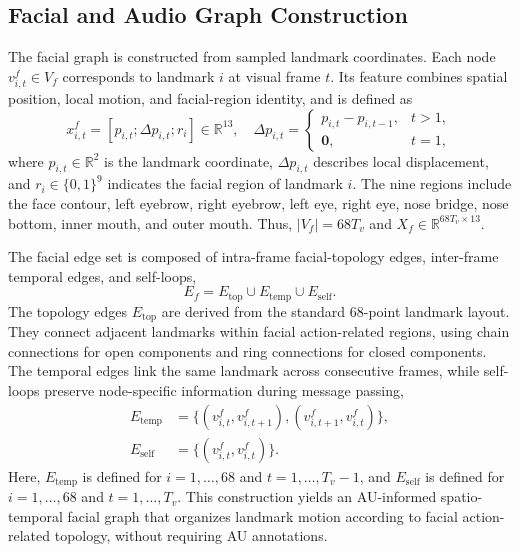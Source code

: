 \documentclass[conference]{IEEEtran}
\begin{document}
\subsection{Facial and Audio Graph Construction}

The facial graph is constructed from sampled landmark coordinates. Each node $v^f_{i,t}\in V_f$ corresponds to landmark $i$ at visual frame $t$. Its feature combines spatial position, local motion, and facial-region identity, and is defined as
\begin{equation}
x^f_{i,t}=[p_{i,t};\Delta p_{i,t};r_i]\in\mathbb{R}^{13},
\quad
\Delta p_{i,t}=
\begin{cases}
p_{i,t}-p_{i,t-1}, & t>1,\\
\mathbf{0}, & t=1,
\end{cases}
\label{eqfacenode}
\end{equation}
where $p_{i,t}\in\mathbb{R}^{2}$ is the landmark coordinate, $\Delta p_{i,t}$ describes local displacement, and $r_i\in\{0,1\}^{9}$ indicates the facial region of landmark $i$. The nine regions include the face contour, left eyebrow, right eyebrow, left eye, right eye, nose bridge, nose bottom, inner mouth, and outer mouth. Thus, $|V_f|=68T_v$ and $X_f\in\mathbb{R}^{68T_v\times 13}$.

The facial edge set is composed of intra-frame facial-topology edges, inter-frame temporal edges, and self-loops,
\begin{equation}
E_f=E_{\mathrm{top}}\cup E_{\mathrm{temp}}\cup E_{\mathrm{self}}.
\label{eqfaceedges}
\end{equation}
The topology edges $E_{\mathrm{top}}$ are derived from the standard 68-point landmark layout. They connect adjacent landmarks within facial action-related regions, using chain connections for open components and ring connections for closed components. The temporal edges link the same landmark across consecutive frames, while self-loops preserve node-specific information during message passing,
\begin{equation}
\begin{aligned}
E_{\mathrm{temp}}
&=\{(v^f_{i,t},v^f_{i,t+1}),
(v^f_{i,t+1},v^f_{i,t})\},\\
E_{\mathrm{self}}
&=\{(v^f_{i,t},v^f_{i,t})\}.
\end{aligned}
\label{eqtempself}
\end{equation}
Here, $E_{\mathrm{temp}}$ is defined for $i=1,\ldots,68$ and $t=1,\ldots,T_v-1$, and $E_{\mathrm{self}}$ is defined for $i=1,\ldots,68$ and $t=1,\ldots,T_v$. This construction yields an AU-informed spatio-temporal facial graph that organizes landmark motion according to facial action-related topology, without requiring AU annotations.
\end{document}
